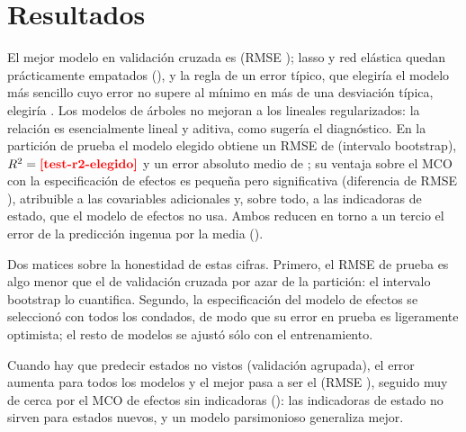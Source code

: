 \section{Resultados}




El mejor modelo en validación cruzada es  (RMSE ); lasso y
red elástica quedan prácticamente empatados (), y la regla de un error típico,
que elegiría el modelo más sencillo cuyo error no supere al mínimo en más de una desviación típica,
elegiría . Los modelos de árboles no mejoran a los lineales regularizados: la
relación es esencialmente lineal y aditiva, como sugería el diagnóstico. En la partición de prueba
el modelo elegido obtiene un RMSE de   (intervalo
bootstrap), $R^2=\res{test-r2-elegido}$ y un error absoluto medio de ; su
ventaja sobre el MCO con la especificación de efectos es pequeña pero significativa (diferencia de
RMSE ), atribuible a las covariables adicionales y, sobre todo, a las
indicadoras de estado, que el modelo de efectos no usa. Ambos reducen en torno a un tercio el error
de la predicción ingenua por la media ().


Dos matices sobre la honestidad de estas cifras. Primero, el RMSE de prueba es algo menor que el de
validación cruzada por azar de la partición: el intervalo bootstrap lo cuantifica. Segundo, la
especificación del modelo de efectos se seleccionó con todos los condados, de modo que su error en
prueba es ligeramente optimista; el resto de modelos se ajustó sólo con el entrenamiento.

Cuando hay que predecir estados no vistos (validación agrupada), el error aumenta para todos los
modelos y el mejor pasa a ser el  (RMSE ), seguido
muy de cerca por el MCO de efectos sin indicadoras (): las indicadoras
de estado no sirven para estados nuevos, y un modelo parsimonioso generaliza mejor.

